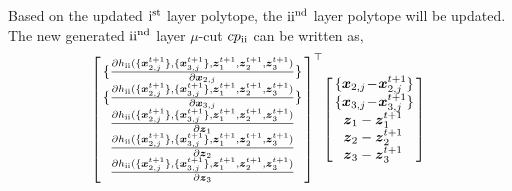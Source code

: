 \documentclass[letterpaper]{article}
\begin{document}
Based on the updated ${\rm{\uppercase\expandafter{\romannumeral1}}}^{\rm{st}}$ layer polytope, the ${\rm{\uppercase\expandafter{\romannumeral2}}}^{\rm{nd}}$ layer polytope will be updated.  The new generated ${\rm{\uppercase\expandafter{\romannumeral2}}}^{\rm{nd}}$ layer $\mu$-cut ${cp_{\rm{\uppercase\expandafter{\romannumeral2}}}}$ can be written as,
\begin{equation}
\label{eq:new_outer_cp}
\begin{array}{l}
\! {\left[ \! \begin{array}{l}
\!\{\frac{{\partial h_{{\rm{\uppercase\expandafter{\romannumeral2}}}}(\{{\boldsymbol{x}_{2,j}^{t+1}}\} ,\{ {\boldsymbol{x}_{3,j}^{t+1}}\} ,{\boldsymbol{z}_1^{t+1}}{\rm{,}}{\boldsymbol{z}_2^{t+1}},{\boldsymbol{z}_3^{t+1}})}}{{\partial {\boldsymbol{x}_{2,j}}}} \}\!\\
\!\{\frac{{\partial h_{{\rm{\uppercase\expandafter{\romannumeral2}}}}(\{{\boldsymbol{x}_{2,j}^{t+1}}\} ,\{ {\boldsymbol{x}_{3,j}^{t+1}}\} ,{\boldsymbol{z}_1^{t+1}}{\rm{,}}{\boldsymbol{z}_2^{t+1}},{\boldsymbol{z}_3^{t+1}})}}{{\partial {\boldsymbol{x}_{3,j}}}} \}\!\\
\, \, \frac{{\partial h_{{\rm{\uppercase\expandafter{\romannumeral2}}}}(\{{\boldsymbol{x}_{2,j}^{t+1}}\} ,\{ {\boldsymbol{x}_{3,j}^{t+1}}\} ,{\boldsymbol{z}_1^{t+1}}{\rm{,}}{\boldsymbol{z}_2^{t+1}},{\boldsymbol{z}_3^{t+1}})}}{{\partial \boldsymbol{z}_1}} \\
\, \,  \frac{{\partial h_{{\rm{\uppercase\expandafter{\romannumeral2}}}}(\{{\boldsymbol{x}_{2,j}^{t+1}}\} ,\{ {\boldsymbol{x}_{3,j}^{t+1}}\} ,{\boldsymbol{z}_1^{t+1}}{\rm{,}}{\boldsymbol{z}_2^{t+1}},{\boldsymbol{z}_3^{t+1}})}}{{\partial \boldsymbol{z}_2}} \\
\, \,  \frac{{\partial h_{{\rm{\uppercase\expandafter{\romannumeral2}}}}(\{{\boldsymbol{x}_{2,j}^{t+1}}\} ,\{ {\boldsymbol{x}_{3,j}^{t+1}}\} ,{\boldsymbol{z}_1^{t+1}}{\rm{,}}{\boldsymbol{z}_2^{t+1}},{\boldsymbol{z}_3^{t+1}})}}{{\partial \boldsymbol{z}_3}}
\end{array} \! \right]^{\top}}\! \left[\! \begin{array}{l}
\! \{ \boldsymbol{x}_{2,j} \!-\! \boldsymbol{x}_{2,j}^{t+1} \}\!\\
\!\{ \boldsymbol{x}_{3,j} \!-\! \boldsymbol{x}_{3,j}^{t+1} \}\!\\
\; \,  \boldsymbol{z}_1 - \boldsymbol{z}_1^{t+1}  \\
\; \,  \boldsymbol{z}_2 - {\boldsymbol{z}_2^{t+1}} \\
\; \,  \boldsymbol{z}_3 - \boldsymbol{z}_3^{t+1}
\end{array} \! \right] \\


\end{array}
\end{equation}
\end{document}
